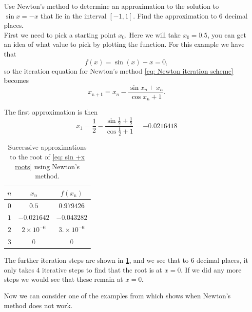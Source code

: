 \begin{ex}
Use Newton's method to determine an approximation to the solution to $\sin{x} = -x$ that lie in the interval $[-1,1]$. Find the approximation to $6$ decimal places.\\

First we need to pick a starting point $x_{0}$. Here we will take $x_{0}=0.5$, you can get an idea of what value to pick by plotting the function. For this example we have that
\begin{equation}
f(x)=\sin(x)+x=0,
\label{eq: sin +x roots}
\end{equation}
so the iteration equation for Newton's method \cref{eq: Newton iteration scheme} becomes
\begin{equation*}
x_{n+1}=x_{n}-\frac{\sin{x_{n}}+x_{n}}{\cos{x_{n}}+1}.
\end{equation*}

The first approximation is then
\begin{equation*}
x_{1}=\frac{1}{2}-\frac{\sin{\frac{1}{2}}+\frac{1}{2}}{\cos{\frac{1}{2}}+1}=-0.0216418
\end{equation*}

\begin{table}[ht]
\centering
\caption{Successive approximations to the root of \cref{eq: sin +x roots} using Newton's method.}

\vspace{2mm}

\label{table:4}



\begin{tabular}{|c|c|c|} 
 \hline
$n$& $x_{n}$ &$f(x_{n})$\\
 \hline
 $0$ & $0.5$ & $0.979426$ \\
 \hline
$1$ &$-0.021642$ & $-0.043282$ \\
\hline
$2$ &$2\times10^{-6}$ & $3.\times10^{-6}$	\\
\hline
$3$ & $0$& $0$\\
\hline
\end{tabular}
\end{table}

The further iteration steps are shown in \cref{table:4}, and we see that to 6 decimal places, it only takes $4$ iterative steps to find that the root is at $x=0$. If we did any more steps we would see that these remain at $x=0$.

\end{ex}

Now we can consider one of the examples from \citep{calcI} which shows when Newton's method does not work.

